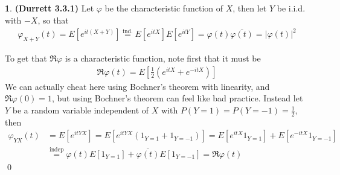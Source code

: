 \documentclass[10.5pt]{article}
\theoremstyle{definition}
\newtheorem{pb}{}
\newcommand{\abs}[1]{\lvert#1\rvert}
\begin{document}
    \begin{pb}\textbf{(Durrett 3.3.1)}
        Let \(\varphi\) be the characteristic function of \(X\), then let \(Y\) be i.i.d. with \(-X\), so that
        \begin{align*}
            \varphi_{X+Y}(t) = E[e^{it(X+Y)}] \overset{\text{ind.}}{=} E[e^{itX}]E[e^{itY}] = \varphi(t)\overline{\varphi(t)} = \abs{\varphi(t)}^2
        \end{align*}

        To get that \(\Re \varphi\) is a characteristic function, note first that it must be
        \begin{align*}
            \Re \varphi(t) = E\left[\frac{1}{2}(e^{itX} + e^{-itX})\right]
        \end{align*}
        We can actually cheat here using Bochner's theorem with linearity, and \(\Re \varphi(0) = 1\), but using Bochner's theorem can feel like bad practice. Instead let \(Y\) be a random variable independent of \(X\) with \(P(Y = 1) = P(Y = -1) = \frac12\), then
        \begin{align*}
            \varphi_{YX}(t) &= E[e^{itYX}] = E[e^{itYX}(1_{Y=1} + 1_{Y=-1})] = E[e^{itX}1_{Y=1}] + E[e^{-itX}1_{Y=-1}] \\
            &\overset{\text{indep}}{=} \varphi(t)E[1_{Y=1}] + \overline{\varphi(t)}E[1_{Y=-1}] = \Re \varphi(t)
        \end{align*} \qed
    \end{pb}
\end{document}
